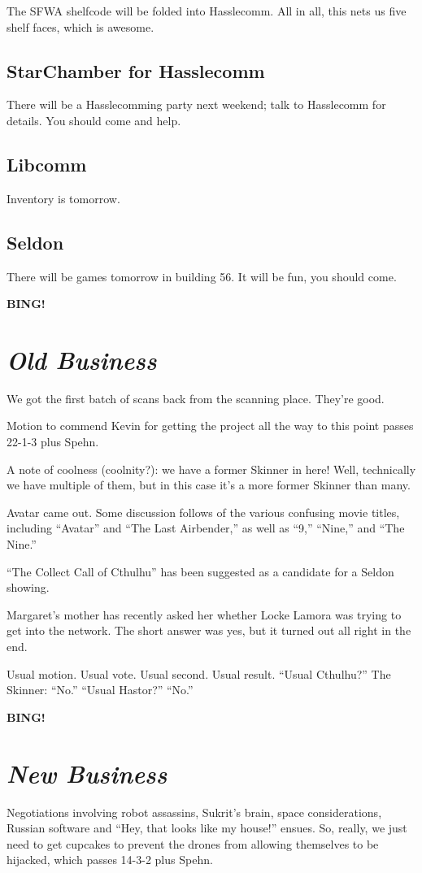 \documentclass[10pt]{article}
\newcommand{\bing}{{\bf BING!} }
\newcommand{\goto}[1]{\bing \vskip 12pt \section*{{\em{#1}}}}
\newcommand{\ps}{ plus Spehn\xspace}
\begin{document}
The SFWA shelfcode will be folded into Hasslecomm. All in all, this nets us five shelf faces, which is awesome.

\subsection*{StarChamber for Hasslecomm}
There will be a Hasslecomming party next weekend; talk to Hasslecomm for details. You should come and help.

\subsection*{Libcomm}
Inventory is tomorrow.

\subsection*{Seldon}
There will be games tomorrow in building 56. It will be fun, you should come.

\goto{Old Business}

We got the first batch of scans back from the scanning place. They're good.

Motion to commend Kevin for getting the project all the way to this point passes 22-1-3\ps.

A note of coolness (coolnity?): we have a former Skinner in here! Well, technically we have multiple of them, but in this case it's a more former Skinner than many.

Avatar came out. Some discussion follows of the various confusing movie titles, including ``Avatar'' and ``The Last Airbender,'' as well as ``9,'' ``Nine,'' and ``The Nine.'' 

``The Collect Call of Cthulhu'' has been suggested as a candidate for a Seldon showing.

Margaret's mother has recently asked her whether Locke Lamora was trying to get into the network. The short answer was yes, but it turned out all right in the end.

Usual motion. Usual vote. Usual second. Usual result. ``Usual Cthulhu?'' The Skinner: ``No.'' ``Usual Hastor?'' ``No.''

\goto{New Business}

Negotiations involving robot assassins, Sukrit's brain, space considerations, Russian software and ``Hey, that looks like my house!'' ensues. So, really, we just need to get cupcakes to prevent the drones from allowing themselves to be hijacked, which passes 14-3-2\ps.
\end{document}
